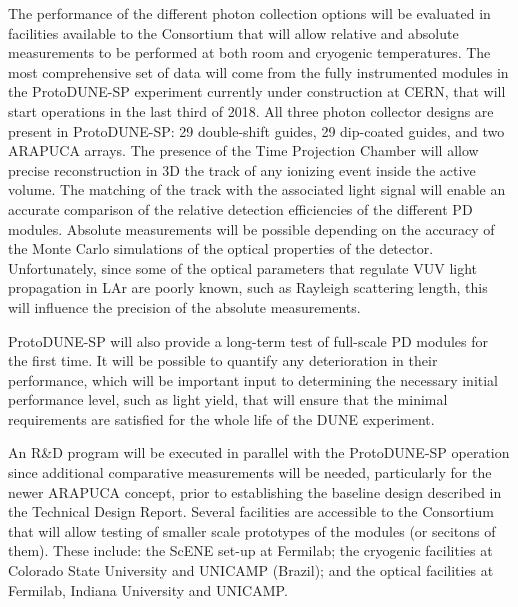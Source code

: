 The performance of the different photon collection options will be 
evaluated in facilities available to the Consortium that will allow
relative and absolute measurements to be performed at both room and cryogenic temperatures.
The most comprehensive set of data will come from the fully instrumented modules in the ProtoDUNE-SP experiment currently 
under construction at CERN, that will start operations in the last third of \num{2018}.
All  three photon collector designs are present in ProtoDUNE-SP: \num{29} 
double-shift guides, \num{29} dip-coated guides, and two ARAPUCA arrays. The 
presence of the Time Projection Chamber will allow  precise reconstruction
in 3D the track of any ionizing event inside the active volume. The 
matching of the track with the associated light signal will enable an
accurate comparison of the relative detection efficiencies of the different PD 
modules. 
Absolute measurements will be possible depending on the accuracy of the
Monte Carlo simulations of the optical properties of the detector. 
Unfortunately, since some of the optical parameters that 
regulate VUV light propagation in LAr are poorly known, such as Rayleigh 
scattering length, this will influence the precision of the absolute 
measurements. 

ProtoDUNE-SP will also provide a long-term test of full-scale PD modules for the first time. It will be possible to quantify any deterioration in their performance, which will be important input to determining the necessary initial performance level, such as light yield, that will ensure that the minimal requirements are satisfied for the whole life of the DUNE experiment.

An R\&D program will be executed in parallel with the ProtoDUNE-SP operation since 
additional comparative measurements will be needed, particularly for the newer ARAPUCA concept, prior to establishing the baseline design described in the Technical Design Report.
Several facilities are accessible to the Consortium that will allow testing of smaller scale prototypes of the modules (or secitons of them). 
These include: the ScENE set-up at Fermilab; the cryogenic facilities at Colorado State University and UNICAMP (Brazil); and the optical facilities at Fermilab, Indiana University and UNICAMP.

